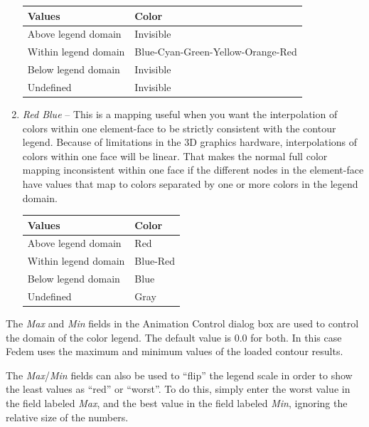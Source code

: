 \begin{enumerate}
  \begin{tabular}{ | m{4.0cm} | m{6cm} | }
    \hline
    Values               & Color \\
    \hline\hline
    Above legend domain  & Invisible \\
    \hline
    Within legend domain & Blue-Cyan-Green-Yellow-Orange-Red \\
    \hline
    Below legend domain  & Invisible \\
    \hline
    Undefined            & Invisible \\
    \hline
  \end{tabular}

\item{\sl Red Blue} --
  This is a mapping useful when you want the interpolation of colors within one
  element-face to be strictly consistent with the contour legend.
  Because of limitations in the 3D graphics hardware, interpolations of colors
  within one face will be linear. That makes the normal full color mapping
  inconsistent within one face if the different nodes in the element-face
  have values that map to colors separated by one or more colors in the legend
  domain.

  \begin{tabular}{ | m{4.0cm} | m{3cm} | }
    \hline
    Values               & Color \\
    \hline\hline
    Above legend domain  & Red \\
    \hline
    Within legend domain & Blue-Red \\
    \hline
    Below legend domain  & Blue \\
    \hline
    Undefined            & Gray \\
    \hline
  \end{tabular}

\end{enumerate}


The {\sl Max} and {\sl Min} fields in the Animation Control dialog box are used
to control the domain of the color legend. The default value is 0.0 for both.
In this case Fedem uses the maximum and minimum values of the loaded contour
results.

The {\sl Max}/{\sl Min} fields can also be used to ``flip'' the legend scale in
order to show the least values as ``red'' or ``worst''. To do this,
simply enter the worst value in the field labeled {\sl Max}, and the best value
in the field labeled {\sl Min}, ignoring the relative size of the numbers.

